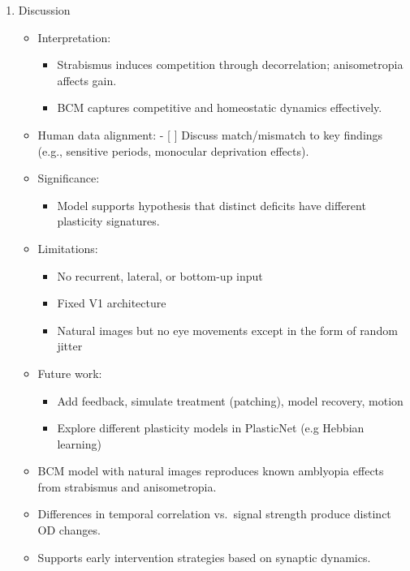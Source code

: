 \documentclass[
]{article}
\providecommand{\tightlist}{%
  \setlength{\itemsep}{0pt}\setlength{\parskip}{0pt}}
\begin{document}
\begin{enumerate}
\def\labelenumi{\arabic{enumi}.}
\setcounter{enumi}{5}
\tightlist
\item
  Discussion

  \begin{itemize}
  \tightlist
  \item[$\boxtimes$]
    Interpretation:

    \begin{itemize}
    \tightlist
    \item[$\boxtimes$]
      Strabismus induces competition through decorrelation;
      anisometropia affects gain.
    \item[$\boxtimes$]
      BCM captures competitive and homeostatic dynamics effectively.
    \end{itemize}
  \item[$\boxtimes$]
    Human data alignment: - {[} {]} Discuss match/mismatch to key
    findings (e.g., sensitive periods, monocular deprivation effects).
  \item[$\boxtimes$]
    Significance:

    \begin{itemize}
    \tightlist
    \item[$\boxtimes$]
      Model supports hypothesis that distinct deficits have different
      plasticity signatures.
    \end{itemize}
  \item[$\boxtimes$]
    Limitations:

    \begin{itemize}
    \tightlist
    \item[$\boxtimes$]
      No recurrent, lateral, or bottom-up input
    \item[$\boxtimes$]
      Fixed V1 architecture
    \item[$\boxtimes$]
      Natural images but no eye movements except in the form of random
      jitter
    \end{itemize}
  \item[$\boxtimes$]
    Future work:

    \begin{itemize}
    \tightlist
    \item[$\boxtimes$]
      Add feedback, simulate treatment (patching), model recovery,
      motion
    \item[$\boxtimes$]
      Explore different plasticity models in PlasticNet (e.g Hebbian
      learning)
    \end{itemize}
  \item[$\boxtimes$]
    BCM model with natural images reproduces known amblyopia effects
    from strabismus and anisometropia.
  \item[$\boxtimes$]
    Differences in temporal correlation vs.~signal strength produce
    distinct OD changes.
  \item[$\boxtimes$]
    Supports early intervention strategies based on synaptic dynamics.
  \end{itemize}
\end{enumerate}
\end{document}

